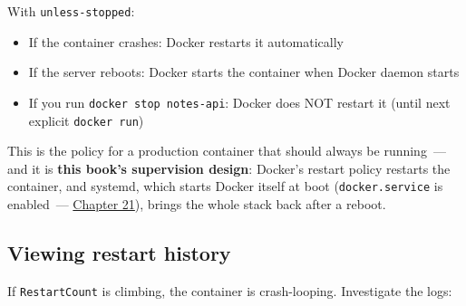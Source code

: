 \noindent{}With \texttt{unless-stopped}:

\begin{itemize}
\tightlist
\item
  If the container crashes: Docker restarts it automatically
\item
  If the server reboots: Docker starts the container when Docker daemon starts
\item
  If you run \texttt{docker\ stop\ notes-api}: Docker does NOT restart it (until next explicit \texttt{docker\ run})
\end{itemize}

\noindent{}This is the policy for a production container that should always be running~--- and it is \textbf{this book's supervision design}: Docker's restart policy restarts the container, and systemd, which starts Docker itself at boot (\texttt{docker.service} is enabled~--- \hyperref[ch:21-system-setup]{Chapter 21}), brings the whole stack back after a reboot.

\subsection*{Viewing restart history}\label{24-process-startup:viewing-restart-history}

\begin{codebox}[short]

\begin{Shaded}
\begin{Highlighting}[]
 \DataTypeTok{\textbackslash{}}
\end{Highlighting}
\end{Shaded}

\end{codebox}

\noindent{}If \texttt{RestartCount} is climbing, the container is crash-looping. Investigate the logs:

\begin{codebox}[short]

\begin{Shaded}
\begin{Highlighting}[]
\OperatorTok{=}
\end{Highlighting}
\end{Shaded}

\end{codebox}

